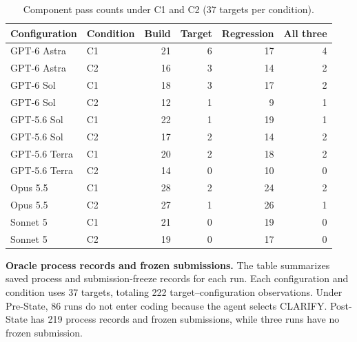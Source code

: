 \documentclass{article} %
\begin{document}
\begin{table}[htbp]
\caption{Component pass counts under C1 and C2 (37 targets per condition).}
\label{tab:history-component-counts}
\centering\normalsize
\setlength{\tabcolsep}{3pt}
\renewcommand{\arraystretch}{1.08}
\begin{tabularx}{\linewidth}{@{}>{\raggedright\arraybackslash}Xlrrrr@{}}
\toprule
Configuration & Condition & Build & Target & Regression & All three \\
\midrule
GPT-6 Astra & C1 & 21 & 6 & 17 & 4 \\
GPT-6 Astra & C2 & 16 & 3 & 14 & 2 \\
GPT-6 Sol & C1 & 18 & 3 & 17 & 2 \\
GPT-6 Sol & C2 & 12 & 1 & 9 & 1 \\
GPT-5.6 Sol & C1 & 22 & 1 & 19 & 1 \\
GPT-5.6 Sol & C2 & 17 & 2 & 14 & 2 \\
GPT-5.6 Terra & C1 & 20 & 2 & 18 & 2 \\
GPT-5.6 Terra & C2 & 14 & 0 & 10 & 0 \\
Opus 5.5 & C1 & 28 & 2 & 24 & 2 \\
Opus 5.5 & C2 & 27 & 1 & 26 & 1 \\
Sonnet 5 & C1 & 21 & 0 & 19 & 0 \\
Sonnet 5 & C2 & 19 & 0 & 17 & 0 \\
\bottomrule
\end{tabularx}
\end{table}

\textbf{Oracle process records and frozen submissions.} The table summarizes saved process and submission-freeze records for each run. Each configuration and condition uses 37 targets, totaling 222 target--configuration observations. Under Pre-State, 86 runs do not enter coding because the agent selects CLARIFY. Post-State has 219 process records and frozen submissions, while three runs have no frozen submission.
\end{document}
